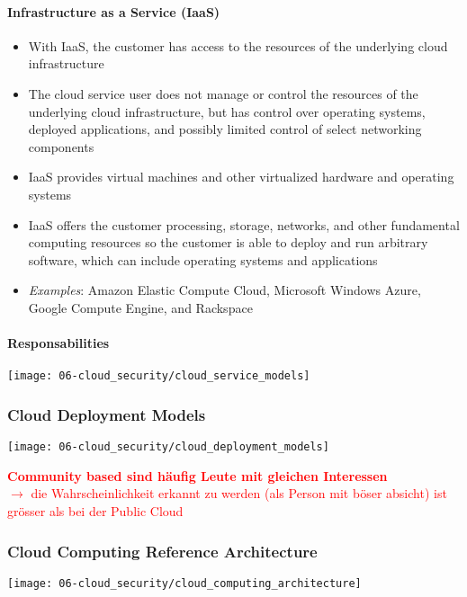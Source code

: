 \paragraph{Infrastructure as a Service (IaaS)}
\begin{itemize}
    \item With IaaS, the customer has access to the resources of the underlying cloud infrastructure
    \item The cloud service user does not manage or control the resources of the underlying cloud infrastructure, but has control over operating systems, deployed applications, and possibly limited control of select networking components
    \item IaaS provides virtual machines and other virtualized hardware and operating systems
    \item IaaS offers the customer processing, storage, networks, and other fundamental computing resources so the customer is able to deploy and run arbitrary software, which can include operating systems and applications
    \item \textit{Examples}: Amazon Elastic Compute Cloud, Microsoft Windows Azure, Google Compute Engine, and Rackspace
\end{itemize}

\paragraph{Responsabilities}
\begin{center}
    \texttt{[image: 06-cloud\_security/cloud\_service\_models]}
    \vspace{-8pt}
\end{center}

\subsubsection{Cloud Deployment Models}
\begin{center}
    \texttt{[image: 06-cloud\_security/cloud\_deployment\_models]}
    \vspace{-8pt}
\end{center}

\textcolor{red}{\textbf{Community based sind häufig Leute mit gleichen Interessen}\\
$\rightarrow$ die Wahrscheinlichkeit erkannt zu werden (als Person mit böser absicht) ist grösser als bei der Public Cloud}

\subsubsection{Cloud Computing Reference Architecture}
\begin{center}
    \texttt{[image: 06-cloud\_security/cloud\_computing\_architecture]}
    \vspace{-8pt}
\end{center}

